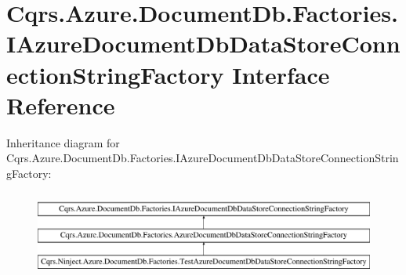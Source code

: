 \hypertarget{interfaceCqrs_1_1Azure_1_1DocumentDb_1_1Factories_1_1IAzureDocumentDbDataStoreConnectionStringFactory}{}\section{Cqrs.\+Azure.\+Document\+Db.\+Factories.\+I\+Azure\+Document\+Db\+Data\+Store\+Connection\+String\+Factory Interface Reference}
\label{interfaceCqrs_1_1Azure_1_1DocumentDb_1_1Factories_1_1IAzureDocumentDbDataStoreConnectionStringFactory}
Inheritance diagram for Cqrs.\+Azure.\+Document\+Db.\+Factories.\+I\+Azure\+Document\+Db\+Data\+Store\+Connection\+String\+Factory\+:\begin{figure}[H]
\begin{center}
\leavevmode
\includegraphics[height=2.847458cm]{interfaceCqrs_1_1Azure_1_1DocumentDb_1_1Factories_1_1IAzureDocumentDbDataStoreConnectionStringFactory}
\end{center}
\end{figure}
